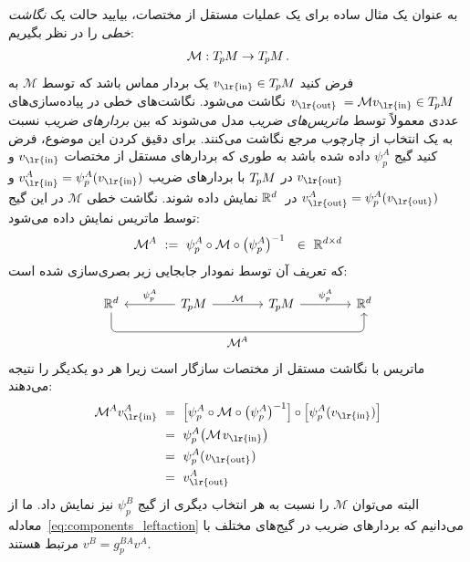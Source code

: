 به عنوان یک مثال ساده برای یک عملیات مستقل از مختصات، بیایید حالت یک \emph{نگاشت خطی} را در نظر بگیریم:
\begin{align}
	\mathcal{M}:T_{\mkern-1.5mu p}\mkern-.5muM\to T_{\mkern-1.5mu p}\mkern-.5muM \,.
\end{align}
فرض کنید $v_\text{\lr{in}}\in \TpM$ یک بردار مماس باشد که توسط $\mathcal{M}$ به $v_\text{\lr{out} }= \mathcal{M} v_\text{\lr{in}} \in \TpM$ نگاشت می‌شود.
نگاشت‌های خطی در پیاده‌سازی‌های عددی معمولاً توسط \emph{ماتریس‌های ضریب} مدل می‌شوند که بین \emph{بردارهای ضریب} نسبت به یک انتخاب از چارچوب مرجع نگاشت می‌کنند.
برای دقیق کردن این موضوع، فرض کنید گیج $\psi_p^A$ داده شده باشد به طوری که بردارهای مستقل از مختصات $v_\textup{\lr{in}}$ و $v_\textup{\lr{out}}$ در $T_{\mkern-1.5mu p}\mkern-.5muM$ با بردارهای ضریب $v_\text{\lr{in}}^A=\psi_p^A(v_\text{\lr{in}})$ و $v_\text{\lr{out}}^A=\psi_p^A(v_\text{\lr{out}})$ در~$\mathbb{R}^d$ نمایش داده شوند.
نگاشت خطی $\mathcal{M}$ در این گیج توسط ماتریس نمایش داده می‌شود:
\begin{align}\label{eq:matrix_trivialization}
	\MAA\ :=\ \psi_p^A \circ \mathcal{M} \circ \big(\psi_p^A\big)^{-1} \ \ \in\ \R^{d\times d}
\end{align}
که تعریف آن توسط نمودار جابجایی زیر بصری‌سازی شده است:
\begin{equation}\label{eq:bundle_morphism_onexone}
	\begin{tikzcd}[row sep=4.em, column sep=4.em]
		\R^d
		\arrow[rrr, pos=.5, rounded corners, to path={
			-- ([yshift=-3.5ex]\tikztostart.south)
			--node[below]{\small$
				\MAA
				$} ([yshift=-3.5ex]\tikztotarget.south)
			-- (\tikztotarget.south)
		}]
		& \TpM  \arrow[r, "\mathcal{M}"]
		\arrow[l, "\psi_p^A"']
		& \TpM  \arrow[r, "\psi_p^A"]
		& \R^d
	\end{tikzcd}
\end{equation}
ماتریس با نگاشت مستقل از مختصات سازگار است زیرا هر دو یکدیگر را نتیجه می‌دهند:
\begin{align}
	\MAA v^A_\text{\lr{in}}
	\ &=\ \pig[ \psi_p^A \circ \mathcal{M} \circ \big(\psi_p^A\big)^{-1} \pig] \circ \pig[ \psi_p^A(v_\text{\lr{in}}) \pig] \notag \\
	\ &=\ \psi_p^A \big( \mathcal{M}\mkern2mu v_\text{\lr{in}} \big) \notag \\
	\ &=\ \psi_p^A (v_\text{\lr{out}}) \notag \\
	\ &=\ v_\text{\lr{out}}^A
\end{align}
البته می‌توان $\mathcal{M}$ را نسبت به هر انتخاب دیگری از گیج $\psi_p^B$ نیز نمایش داد.
ما از معادله~\eqref{eq:components_leftaction} می‌دانیم که بردارهای ضریب در گیج‌های مختلف با $v^B = g_p^{BA} v^A$ مرتبط هستند.
